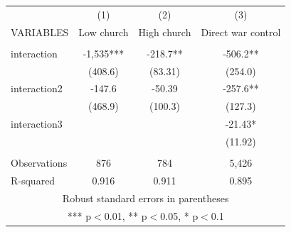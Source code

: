 \begin{tabular}{lccc} \hline
 & (1) & (2) & (3) \\
VARIABLES & Low church & High church & Direct war control \\ \hline
 &  &  &  \\
interaction & -1,535*** & -218.7** & -506.2** \\
 & (408.6) & (83.31) & (254.0) \\
interaction2 & -147.6 & -50.39 & -257.6** \\
 & (468.9) & (100.3) & (127.3) \\
interaction3 &  &  & -21.43* \\
 &  &  & (11.92) \\
 &  &  &  \\
Observations & 876 & 784 & 5,426 \\
 R-squared & 0.916 & 0.911 & 0.895 \\ \hline
\multicolumn{4}{c}{ Robust standard errors in parentheses} \\
\multicolumn{4}{c}{ *** p$<$0.01, ** p$<$0.05, * p$<$0.1} \\
\end{tabular}

